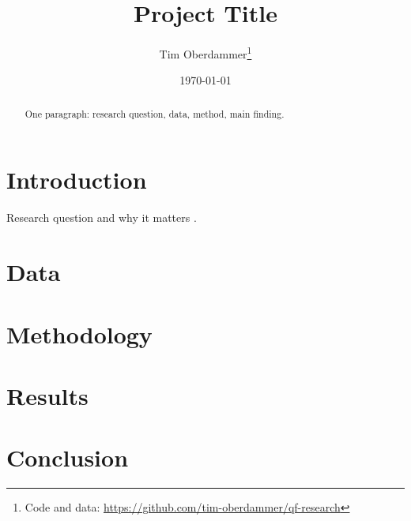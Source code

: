 \documentclass[11pt,a4paper]{article}
\title{Project Title}
\author{Tim Oberdammer\thanks{Code and data:
  \url{https://github.com/tim-oberdammer/qf-research}}}
\date{\today}
\begin{document}
\maketitle

\begin{abstract}
One paragraph: research question, data, method, main finding.
\end{abstract}

\section{Introduction}
Research question and why it matters \citep{litterman1991}.

\section{Data}

\section{Methodology}

\section{Results}
% 

\section{Conclusion}


\end{document}
